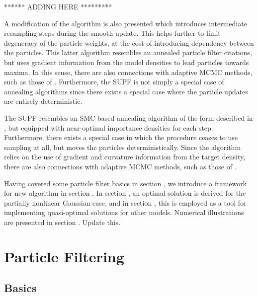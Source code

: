 \documentclass{statsoc}
\begin{document}
{\meta ******* ADDING HERE *********}

A modification of the algorithm is also presented which introduces intermediate resampling steps during the smooth update. This helps further to limit degeneracy of the particle weights, at the cost of introducing dependency between the particles. This latter algorithm resembles an annealed particle filter {\meta citations}, but uses gradient information from the model densities to lead particles towards maxima. In this sense, there are also connections with adaptive MCMC methods, such as those of \citep{Girolami2011}. Furthermore, the SUPF is not simply a special case of annealing algorithms since there exists a special case where the particle updates are entirely deterministic.







The SUPF resembles an SMC-based annealing algorithm of the form described in \citep{DelMoral2006}, but equipped with near-optimal importance densities for each step. Furthermore, there exists a special case in which the procedure ceases to use sampling at all, but moves the particles deterministically. Since the algorithm relies on the use of gradient and curvature information from the target density, there are also connections with adaptive MCMC methods, such as those of \citep{Girolami2011}.

Having covered some particle filter basics in section , we introduce a framework for new algorithm in section . In section , an optimal solution is derived for the partially nonlinear Gaussian case, and in section , this is employed as a tool for implementing quasi-optimal solutions for other models. Numerical illustrations are presented in section . {\meta Update this.}



\section{Particle Filtering}

\subsection{Basics}
\end{document}
